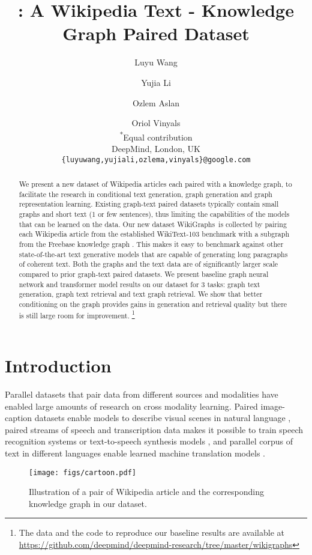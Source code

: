 \documentclass[11pt]{article}
\title{\ourdataset: A Wikipedia Text - Knowledge Graph Paired Dataset}
\author{Luyu Wang\textsuperscript{\normalfont{*}}\and Yujia Li\textsuperscript{\normalfont{*}}\and Ozlem Aslan\and Oriol Vinyals \\
  \textsuperscript{*}Equal contribution \\
  DeepMind, London, UK \\
  \texttt{\{luyuwang,yujiali,ozlema,vinyals\}@google.com}
}
\newcommand{\ourdataset}{{WikiGraphs}}
\begin{document}
\maketitle
\begin{abstract}
We present a new dataset of Wikipedia articles each paired with a knowledge graph, to facilitate the research in conditional text generation, graph generation and graph representation learning.  Existing graph-text paired datasets typically contain small graphs and short text (1 or few sentences), thus limiting the capabilities of the models that can be learned on the data.  Our new dataset \ourdataset~is collected by pairing each Wikipedia article from the established WikiText-103 benchmark \cite{merity2016pointer} with a subgraph from the Freebase knowledge graph \cite{bollacker2008freebase}.  This makes it easy to benchmark against other state-of-the-art text generative models that are capable of generating long paragraphs of coherent text.  Both the graphs and the text data are of significantly larger scale compared to prior graph-text paired datasets. We present baseline graph neural network and transformer model results on our dataset for 3 tasks: graph  text generation, graph  text retrieval and text  graph retrieval. We show that better conditioning on the graph provides gains in generation and retrieval quality but there is still large room for improvement.
\footnote{The data and the code to reproduce our baseline results are available at \url{https://github.com/deepmind/deepmind-research/tree/master/wikigraphs}}
\end{abstract}

\section{Introduction}


Parallel datasets that pair data from different sources and modalities have enabled large amounts of research on cross modality learning.  Paired image-caption datasets enable models to describe visual scenes in natural language \cite{lin2014microsoft,vinyals2016show}, paired streams of speech and transcription data makes it possible to train speech recognition systems \cite{garofolo1993darpa,panayotov2015librispeech} or text-to-speech synthesis models \cite{oord2016wavenet},
and parallel corpus of text in different languages enable learned machine translation models \cite{barrault2020findings}.

\begin{figure}[t]
    \centering
\texttt{[image: figs/cartoon.pdf]}
    \caption{Illustration of a pair of Wikipedia article and the corresponding knowledge graph in our dataset.
}
    \label{fig:cartoon-example}
\end{figure}
\end{document}
